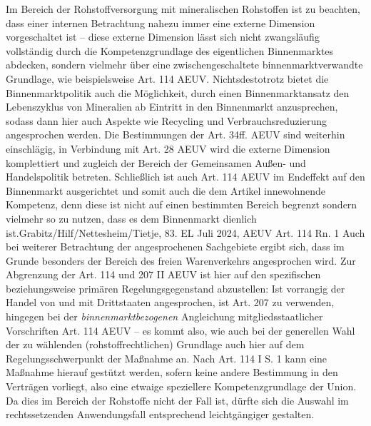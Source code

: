 \documentclass[12pt,a4paper,oneside]{book} %
\begin{document}
Im Bereich der Rohstoffversorgung mit mineralischen Rohstoffen ist zu beachten, dass einer internen Betrachtung nahezu immer eine externe Dimension vorgeschaltet ist -- diese externe Dimension lässt sich nicht zwangsläufig vollständig durch die Kompetenzgrundlage des eigentlichen Binnenmarktes abdecken, sondern vielmehr über eine zwischengeschaltete binnenmarktverwandte Grundlage, wie beispielsweise Art. 114 AEUV. Nichtsdestotrotz bietet die Binnenmarktpolitik auch die Möglichkeit, durch einen Binnenmarktansatz den Lebenszyklus von Mineralien ab Eintritt in den Binnenmarkt anzusprechen, sodass dann hier auch Aspekte wie Recycling und Verbrauchsreduzierung angesprochen werden. Die Bestimmungen der Art. 34ff. AEUV sind weiterhin einschlägig, in Verbindung mit Art. 28 AEUV wird die externe Dimension komplettiert und zugleich der Bereich der Gemeinsamen Außen- und Handelspolitik betreten. Schließlich ist auch Art. 114 AEUV im Endeffekt auf den Binnenmarkt ausgerichtet und somit auch die dem Artikel innewohnende Kompetenz, denn diese ist nicht auf einen bestimmten Bereich begrenzt sondern vielmehr so zu nutzen, dass es dem Binnenmarkt dienlich ist.\autocite[Auch zur Weite und Unbestimmtheit der Kompetenz]{Streinz, EUV/AEUV Art. 114, Rn. 6}{Grabitz/Hilf/Nettesheim/Tietje, 83. EL Juli 2024, AEUV Art. 114 Rn. 1} Auch bei weiterer Betrachtung der angesprochenen Sachgebiete ergibt sich, dass im Grunde besonders der Bereich des freien Warenverkehrs angesprochen wird.\autocite{Calliess/Ruffert, EUV/AEUV, Art. 114, Rn. 10.} Zur Abgrenzung der Art. 114 und 207 II AEUV ist hier auf den spezifischen beziehungsweise primären Regelungsgegenstand abzustellen: Ist vorrangig der Handel von und mit Drittstaaten angesprochen, ist Art. 207 zu verwenden, hingegen bei der \textit{binnenmarktbezogenen} Angleichung mitgliedsstaatlicher Vorschriften Art. 114 AEUV -- es kommt also, wie auch bei der generellen Wahl der zu wählenden (rohstoffrechtlichen) Grundlage auch hier auf dem Regelungsschwerpunkt der Maßnahme an.\autocites{Calliess/Ruffert, EUV/AEUV, Art. 114, Rn. 157}{Schwarze/Becker/Hatje/Schoo, Art. 114, Rn. 14ff}{Streinz/M. Schröder AEUV Art. 114 Rn. 134}{Vgl. EuGH C-137/12, ECLI:EU:C:2013:675 Rn. 76}
Nach Art. 114 I S. 1 kann eine Maßnahme hierauf gestützt werden, sofern keine andere Bestimmung in den Verträgen vorliegt, also eine etwaige speziellere Kompetenzgrundlage der Union.\autocite[Diese würde insbesondere dann relevant, sollten Harmonisierungsgrenzen oder -verbote betroffen sein, siehe]{Streinz/M. Schröder AEUV Art. 114 Rn. 9} Da dies im Bereich der Rohstoffe nicht der Fall ist, dürfte sich die Auswahl im rechtssetzenden Anwendungsfall entsprechend leichtgängiger gestalten.
\end{document}
